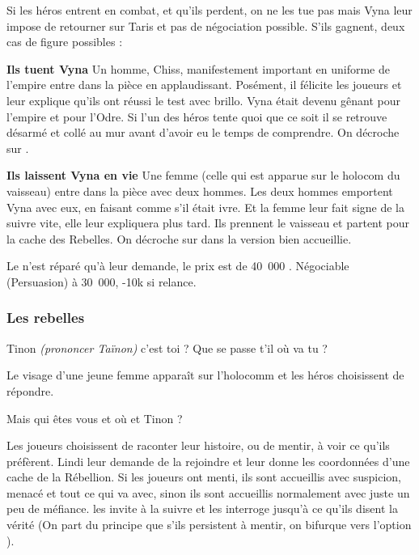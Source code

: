 Si les héros entrent en combat, et qu’ils perdent, on ne les tue pas mais Vyna leur impose de retourner sur Taris et pas de négociation possible. S’ils gagnent, deux cas de figure possibles :
\begin{rebelist}
    \item \textbf{Ils tuent Vyna} Un homme, Chiss, manifestement important en uniforme de l’empire entre dans la pièce en applaudissant. Posément, il félicite les joueurs et leur explique qu’ils ont réussi le test avec brillo. Vyna était devenu gênant pour l’empire et pour l’Odre. Si l’un des héros tente quoi que ce soit il se retrouve désarmé et collé au mur avant d’avoir eu le temps de comprendre. On décroche sur .

    \item \textbf{Ils laissent Vyna en vie} Une femme (celle qui est apparue sur le holocom du vaisseau) entre dans la pièce avec deux hommes. Les deux hommes emportent Vyna avec eux, en faisant comme s’il était ivre. Et la femme leur fait signe de la suivre vite, elle leur expliquera plus tard. Ils prennent le vaisseau et partent pour la cache des Rebelles. On décroche sur  dans la version bien accueillie.
\end{rebelist}

Le  n’est réparé qu’à leur demande, le prix est de 40~000 \crg. Négociable (Persuasion) à 30~000, -10k si relance.


\subsubsection{Les rebelles} \label{sec:les-rebelles}

\begin{quotebox}
    Tinon \emph{(prononcer Taïnon)} c’est toi ? Que se passe t’il où va tu ?
\end{quotebox}

Le visage d’une jeune femme apparaît sur l’holocomm et les héros choisissent de répondre.

\begin{quotebox}
    Mais qui êtes vous et où et Tinon ?
\end{quotebox}
Les joueurs choisissent de raconter leur histoire, ou de mentir, à voir ce qu’ils préfèrent. Lindi leur demande de la rejoindre et leur donne les coordonnées d’une cache de la Rébellion. Si les joueurs ont menti, ils sont accueillis avec suspicion, menacé et tout ce qui va avec, sinon ils sont accueillis normalement avec juste un peu de méfiance.  les invite à la suivre et les interroge jusqu’à ce qu’ils disent la vérité (On part du principe que s’ils persistent à mentir, on bifurque vers l’option ).

